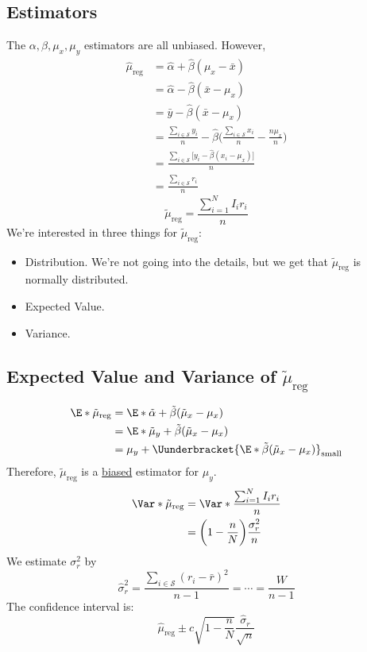 \subsection*{Estimators}
The $ \alpha,\beta,\mu_x,\mu_y $ estimators are all unbiased. However,
\begin{align*}
    \hat{\mu}_{\text{reg}}
     & =\hat{\alpha}+\hat{\beta}(\mu_x-\bar{x})                                                                              \\
     & =\hat{\alpha}-\hat{\beta}(\bar{x}-\mu_x)                                                                              \\
     & =\bar{y}-\hat{\beta}(\bar{x}-\mu_x)                                                                                   \\
     & =\frac{\sum_{i\in\mathcal{S}}y_i}{n}-\hat{\beta}\biggl(\frac{\sum_{i\in\mathcal{S}}x_i }{n}-\frac{n\mu_x}{n}  \biggr) \\
     & =\frac{\sum_{i\in\mathcal{S}}\bigr[y_i-\hat{\beta}(x_i-\mu_x)\bigl]}{n}                                               \\
     & =\frac{\sum_{i\in\mathcal{S}}r_i }{n}
\end{align*}
\[ \tilde{\mu}_{\text{reg}}=\frac{\sum_{i=1}^{N} I_i r_i}{n} \]
We're interested in three things for $ \tilde{\mu}_{\text{reg}} $:
\begin{itemize}
    \item Distribution. We're not going into the details, but
          we get that $ \tilde{\mu}_{\text{reg}} $ is normally distributed.
    \item Expected Value.
    \item Variance.
\end{itemize}
\subsection*{Expected Value and Variance of $ \tilde{\mu}_{\text{reg}} $}
\begin{align*}
    \E*{\tilde{\mu}_{\text{reg}}}
     & =\E*{\tilde{\alpha}+\tilde{\beta}(\tilde{\mu}_x-\mu_x)}                       \\
     & =\E*{\tilde{\mu}_y+\tilde{\beta}(\tilde{\mu}_x-\mu_x)}                        \\
     & =\mu_y+\Uunderbracket{\E*{\tilde{\beta}(\tilde{\mu}_x-\mu_x)}}_{\text{small}}
\end{align*}
Therefore, $ \tilde{\mu}_{\text{reg}} $ is a \underline{biased} estimator for $ \mu_y $.
\begin{align*}
    \Var*{\tilde{\mu}_{\text{reg}}}
     & =\Var*{\frac{\sum_{i=1}^{N} I_i r_i}{n} }        \\
     & =\biggl(1-\frac{n}{N}\biggr)\frac{\sigma_r^2}{n}
\end{align*}
We estimate $ \sigma_r^2 $ by
\[ \hat{\sigma}_r^2=\frac{\sum_{i\in\mathcal{S}}(r_i-\bar{r})^2}{n-1}=\cdots=\frac{W}{n-1}  \]
The confidence interval is:
\[ \hat{\mu}_{\text{reg}}\pm c\sqrt{1-\frac{n}{N}}\frac{\hat{\sigma}_r}{\sqrt{n}}  \]
